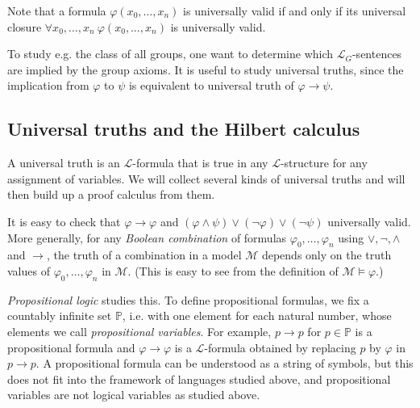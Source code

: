 \documentclass[a4paper, 11pt]{amsart}
\theoremstyle{remark}
\newcommand{\PP}{\mathbb{P}}
\newcommand{\cL}{\mathcal L}
\newcommand{\cM}{\mathcal M}
\begin{document}
Note that a formula $\varphi(x_0,\dots,x_n)$ is universally valid if and only if its universal closure $\forall x_0,\dots,x_n\ \varphi(x_0,\dots,x_n)$ is universally valid. 


To study e.g. the class of all groups, one want to determine which $\cL_G$-sentences are implied by the group axioms. 
It is useful to study universal truths, since the implication from $\varphi$ to $\psi$ is equivalent to universal truth of $\varphi\rightarrow \psi$. 




\subsection{Universal truths and the Hilbert calculus} 
\label{section Universal truths and the Hilbert calculus} 

A universal truth is an $\cL$-formula that is true in any $\cL$-structure for any assignment of variables. 
We will collect several kinds of universal truths and will then build up a proof calculus from them. 


It is easy to check that $\varphi\rightarrow \varphi$ and $(\varphi\wedge \psi) \vee (\neg \varphi) \vee (\neg \psi)$ universally valid. 
More generally, for any \emph{Boolean combination} of formulas $\varphi_0,\dots,\varphi_n$ using $\vee, \neg, \wedge$ and $\rightarrow$, the truth of a combination in a model $\cM$ depends only on the truth values of $\varphi_0,\dots,\varphi_n$ in $\cM$. 
(This is easy to see from the definition of $\cM\models \varphi$.) 


\emph{Propositional logic} studies this. 
To define propositional formulas, we fix a countably infinite set $\PP$, i.e. with one element for each natural number, whose elements we call \emph{propositional variables}. 
For example, $p\rightarrow p$ for $p\in \PP$ is a propositional formula and $\varphi \rightarrow \varphi$ is a $\cL$-formula obtained by replacing $p$ by $\varphi$ in $p\rightarrow p$. 
A propositional formula can be understood as a string of symbols, but this does not fit into the framework of languages studied above, and propositional variables are not logical variables as studied above.  
\end{document}
